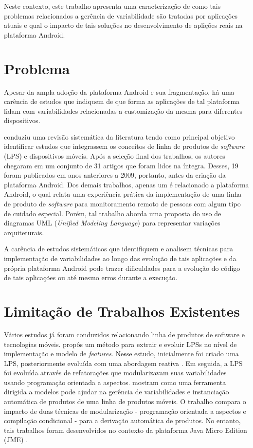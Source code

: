 Neste contexto, este trabalho apresenta uma caracterização de como tais problemas
relacionados a gerência de variabilidade são tratadas por aplicações atuais e
qual o impacto de tais soluções no desenvolvimento de aplições reais na plataforma
Android.

\section{Problema}

Apesar da ampla adoção da plataforma Android e sua fragmentação, há uma carência
de estudos que indiquem de que forma as aplicações de tal plataforma lidam com
variabilidades relacionadas a customização da mesma para diferentes dispositivos. 

 conduziu uma revisão sistemática da literatura tendo como
principal objetivo identificar estudos que integrassem os conceitos de linha de
produtos de \textit{software} (LPS) e dispositivos móveis. Após a seleção final
dos trabalhos, os autores chegaram em um conjunto de 31 artigos que foram lidos
na íntegra. Desses, 19 foram publicados em anos anteriores a 2009, portanto, antes
da criação da plataforma Android. Dos demais trabalhos, apenas um é relacionado a
plataforma Android, o qual relata uma experiência prática da implementação de uma
linha de produto de \textit{software} para monitoramento remoto de pessoas com
algum tipo de cuidado especial. Porém, tal trabalho aborda uma proposta do uso de
diagramas UML (\textit{Unified Modeling Language}) para representar variações arquiteturais.

A carência de estudos sistemáticos que identifiquem e analisem técnicas para
implementação de variabilidades ao longo das evolução de tais aplicações e da
própria plataforma Android pode trazer dificuldades para a evolução do código de
tais aplicações ou até mesmo erros durante a execução.

\section{Limitação de Trabalhos Existentes}

Vários estudos já foram conduzidos relacionando linha de produtos de software e
tecnologias móveis.  propôs um método para extrair e evoluir LPSs
no nível de implementação e modelo de \textit{features}.  Nesse estudo, inicialmente
foi criado uma LPS, posteriormente evoluída com uma abordagem reativa \cite{Krueger2002}.
Em seguida, a LPS foi evoluída através de refatorações que modularizavam suas
variabilidades usando programação orientada a aspectos.  mostram
como uma ferramenta dirigida a modelos pode ajudar na gerência de variabilidades
e instanciação automática de produtos de uma linha de produtos móveis. O trabalho
compara o impacto de duas técnicas de modularização - programação orientada a aspectos
e compilação condicional - para a derivação automática de produtos. No entanto,
tais trabalhos foram desenvolvidos no contexto da plataforma Java Micro Edition (JME) \cite{oraclejme}.

